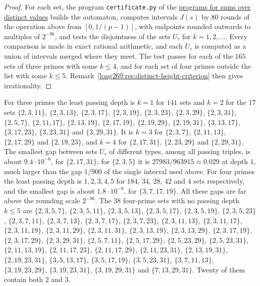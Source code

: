 \documentclass[11pt]{article}
\theoremstyle{remark}
\theoremstyle{plain}
\newcommand{\distinctheighturl}{https://github.com/wcook04/plectis-erdos/tree/10178c4df40cb27d83b5ebb1ec337dd588b82998/research/experiments/erdos269/distinct_height}
\begin{document}
\begin{proof}
For each set, the program \texttt{certificate.py} of the
\href{\distinctheighturl}{programs for sums over distinct values} builds the automaton,
computes intervals $J(s)$ by $80$ rounds of the operation above from
$[0,1/(p-1)]$, with endpoints rounded outwards to multiples of $2^{-96}$, and
tests the disjointness of the sets $U_\tau$ for $k=1,2,\ldots$.  Every
comparison is made in exact rational arithmetic, and each $U_\tau$ is
computed as a union of intervals merged where they meet.  The test passes for
each of the $165$ sets of three primes with some $k\le4$, and for each set of
four primes outside the list with some $k\le5$.
Remark~\ref{long269:res:distinct-height-criterion} then gives
irrationality.
\end{proof}

For three primes the least passing depth is $k=1$ for $141$ sets and $k=2$
for the $17$ sets
$\{2,3,11\}$, $\{2,3,13\}$, $\{2,3,17\}$, $\{2,3,19\}$, $\{2,3,23\}$,
$\{2,3,29\}$, $\{2,3,31\}$, $\{2,5,7\}$, $\{2,11,17\}$, $\{2,13,19\}$,
$\{2,17,19\}$, $\{2,19,29\}$, $\{2,19,31\}$, $\{3,13,17\}$, $\{3,17,23\}$,
$\{3,23,31\}$ and $\{3,29,31\}$.  It is $k=3$ for $\{2,3,7\}$,
$\{2,11,13\}$, $\{2,17,29\}$ and $\{2,19,23\}$, and $k=4$ for
$\{2,17,31\}$, $\{2,23,29\}$ and $\{2,29,31\}$.  The smallest gap between
sets $U_\tau$ of different types, among all passing triples, is about
$9.4\cdot10^{-6}$, for $\{2,17,31\}$; for $\{2,3,5\}$ it is
$27983/963915\approx0.029$ at depth $1$, much larger than the gap $1/900$ of
the single interval used above.  For four primes the least passing depth is
$1,2,3,4,5$ for $184$, $34$, $28$, $42$ and $4$ sets respectively, and the
smallest gap is about $1.8\cdot10^{-8}$, for $\{3,7,17,19\}$.  All these gaps
are far above the rounding scale $2^{-96}$.  The $38$ four-prime sets with no
passing depth $k\le5$ are $\{2,3,5,7\}$, $\{2,3,5,11\}$, $\{2,3,5,13\}$,
$\{2,3,5,17\}$, $\{2,3,5,19\}$, $\{2,3,5,23\}$, $\{2,3,7,11\}$,
$\{2,3,7,13\}$, $\{2,3,7,17\}$, $\{2,3,7,23\}$, $\{2,3,11,13\}$,
$\{2,3,11,17\}$, $\{2,3,11,19\}$, $\{2,3,11,29\}$, $\{2,3,11,31\}$,
$\{2,3,13,19\}$, $\{2,3,13,29\}$, $\{2,3,17,19\}$, $\{2,3,17,29\}$,
$\{2,3,29,31\}$, $\{2,5,7,11\}$, $\{2,5,17,29\}$, $\{2,5,23,29\}$,
$\{2,5,23,31\}$, $\{2,11,13,19\}$, $\{2,11,17,23\}$, $\{2,11,17,29\}$,
$\{2,11,23,31\}$, $\{2,13,19,31\}$, $\{2,19,23,31\}$, $\{3,5,13,17\}$,
$\{3,5,17,19\}$, $\{3,5,23,31\}$, $\{3,7,11,13\}$, $\{3,19,23,29\}$,
$\{3,19,23,31\}$, $\{3,19,29,31\}$ and $\{7,13,29,31\}$.  Twenty of them
contain both $2$ and $3$.
\end{document}
